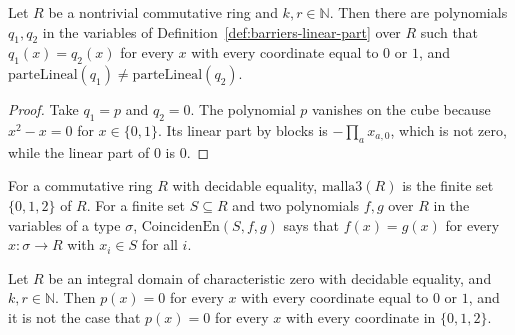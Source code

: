 \begin{theorem}
  \label{thm:barriers-parte-lineal-no-funcional}
  \leanok
  Let $R$ be a nontrivial commutative ring and $k, r \in \mathbb{N}$. Then there are polynomials
  $q_1, q_2$ in the variables of Definition~\ref{def:barriers-linear-part} over $R$ such that
  $q_1(x) = q_2(x)$ for every $x$ with every coordinate equal to $0$ or $1$, and
  $\mathrm{parteLineal}(q_1) \ne \mathrm{parteLineal}(q_2)$.
  \own{}
  \exploration{}
\end{theorem}

\begin{proof}
  \leanok
  Take $q_1 = p$ and $q_2 = 0$. The polynomial $p$ vanishes on the cube because $x^2 - x = 0$ for
  $x \in \{0, 1\}$. Its linear part by blocks is $-\prod_a x_{a,0}$, which is not zero, while the
  linear part of $0$ is $0$.
\end{proof}

\begin{definition}
  \label{def:barriers-grid}
  \leanok
  For a commutative ring $R$ with decidable equality, $\mathrm{malla3}(R)$ is the finite set
  $\{0, 1, 2\}$ of $R$. For a finite set $S \subseteq R$ and two polynomials $f, g$ over $R$ in the
  variables of a type $\sigma$, $\mathrm{CoincidenEn}(S, f, g)$ says that $f(x) = g(x)$ for every $x
  : \sigma \to R$ with $x_i \in S$ for all $i$.
  \own{}
  \exploration{}
\end{definition}

\begin{theorem}
  \label{thm:barriers-la-malla-separa}
  \leanok
  Let $R$ be an integral domain of characteristic zero with decidable equality, and $k, r \in
  \mathbb{N}$. Then $p(x) = 0$ for every $x$ with every coordinate equal to $0$ or $1$, and it is not
  the case that $p(x) = 0$ for every $x$ with every coordinate in $\{0, 1, 2\}$.
  \own{}
  \exploration{}
\end{theorem}

